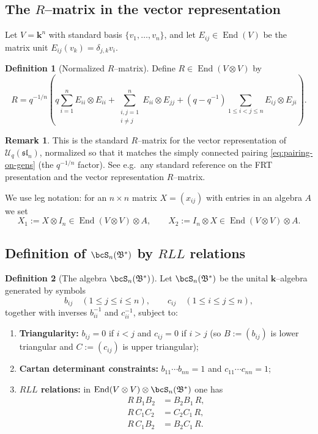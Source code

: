 \documentclass[11pt]{article}
\theoremstyle{definition}
\newtheorem{definition}{Definition}
\newtheorem{remark}{Remark}
\newcommand{\Bbbk}{\mathbf{k}}
\newcommand{\Uc}{\mathcal{U}}
\newcommand{\fsl}{\mathfrak{sl}}
\newcommand{\del}{\delta}
\newcommand{\tensor}{\otimes}
\DeclareMathOperator{\End}{End}
\begin{document}
\subsection{The $R$--matrix in the vector representation}

Let $V=\Bbbk^n$ with standard basis $\{v_1,\dots,v_n\}$, and let $E_{ij}\in \End(V)$ be the matrix unit $E_{ij}(v_k)=\del_{j,k}v_i$.

\begin{definition}[Normalized $R$--matrix]
Define $R\in \End(V\tensor V)$ by
\begin{equation}\label{eq:R-matrix}
R
=
q^{-1/n}\left(
q\sum_{i=1}^n E_{ii}\tensor E_{ii}
+
\sum_{\substack{i,j=1\\ i\ne j}}^n E_{ii}\tensor E_{jj}
+
(q-q^{-1})\sum_{1\le i<j\le n} E_{ij}\tensor E_{ji}
\right).
\end{equation}
\end{definition}

\begin{remark}
This is the standard $R$--matrix for the vector representation of $\Uc_q(\fsl_n)$, normalized so that it matches the simply connected pairing \eqref{eq:pairing-on-gens} (the $q^{-1/n}$ factor). See e.g.\ any standard reference on the FRT presentation and the vector representation $R$--matrix.
\end{remark}

We use leg notation: for an $n\times n$ matrix $X=(x_{ij})$ with entries in an algebra $A$ we set
\[
X_1 := X\tensor I_n \in \End(V\tensor V)\tensor A,
\qquad
X_2 := I_n\tensor X\in \End(V\tensor V)\tensor A.
\]

\subsection{Definition of $\bcS_n(\mathfrak B^*)$ by $RLL$ relations}

\begin{definition}[The algebra $\bcS_n(\mathfrak B^*)$]\label{def:bcS}
Let $\bcS_n(\mathfrak B^*)$ be the unital $\Bbbk$--algebra generated by symbols
\[
b_{ij}\quad (1\le j\le i\le n),
\qquad
c_{ij}\quad (1\le i\le j\le n),
\]
together with inverses $b_{ii}^{-1}$ and $c_{ii}^{-1}$, subject to:
\begin{enumerate}[label=(\alph*)]
\item \textbf{Triangularity:} $b_{ij}=0$ if $i<j$ and $c_{ij}=0$ if $i>j$ (so $B:=(b_{ij})$ is lower triangular and $C:=(c_{ij})$ is upper triangular);
\item \textbf{Cartan determinant constraints:} $b_{11}\cdots b_{nn}=1$ and $c_{11}\cdots c_{nn}=1$;
\item \textbf{$RLL$ relations:} in $\End(V\tensor V)\tensor \bcS_n(\mathfrak B^*)$ one has
\begin{align}
R\,B_1B_2 &= B_2B_1\,R,\label{eq:RLL--minus}\\
R\,C_1C_2 &= C_2C_1\,R,\label{eq:RLL--plus}\\
R\,C_1B_2 &= B_2C_1\,R.\label{eq:RLL--mixed}
\end{align}
\end{enumerate}
\end{definition}
\end{document}
